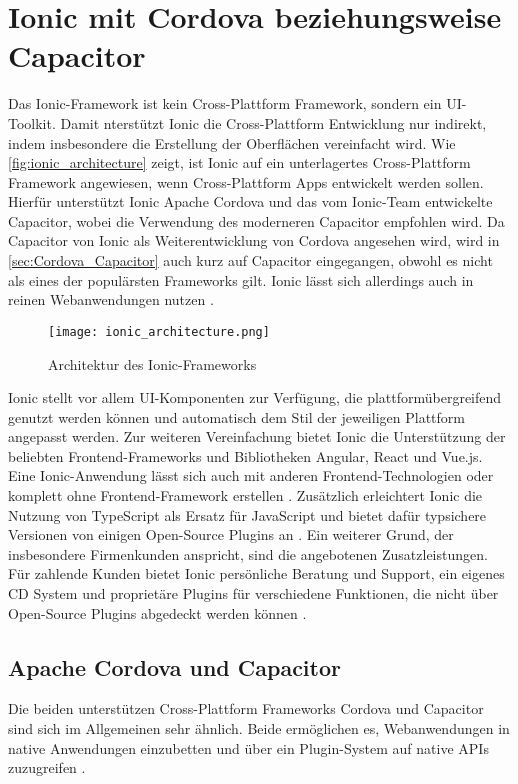 \section{Ionic mit Cordova beziehungsweise Capacitor}
\label{sec:Frameworks_Ionic}

Das Ionic-Framework ist kein Cross-Plattform Framework, sondern ein UI-Toolkit.
Damit nterstützt Ionic die Cross-Plattform Entwicklung nur indirekt, indem insbesondere die Erstellung der Oberflächen vereinfacht wird.
Wie \autoref{fig:ionic_architecture} zeigt, ist Ionic auf ein unterlagertes Cross-Plattform Framework angewiesen, wenn Cross-Plattform Apps entwickelt werden sollen.
Hierfür unterstützt Ionic Apache Cordova und das vom Ionic-Team entwickelte Capacitor, wobei die Verwendung des moderneren Capacitor empfohlen wird.
Da Capacitor von Ionic als Weiterentwicklung von Cordova angesehen wird, wird in \autoref{sec:Cordova_Capacitor} auch kurz auf Capacitor eingegangen, obwohl es nicht als eines der populärsten Frameworks gilt.
Ionic lässt sich allerdings auch in reinen Webanwendungen nutzen \cite{Ionic_Docs}.
\begin{figure}[h]
    \centering
    \texttt{[image: ionic\_architecture.png]}
    \caption{Architektur des Ionic-Frameworks \cite{Ionic_Architektur}}
    \label{fig:ionic_architecture}
\end{figure}
Ionic stellt vor allem UI-Komponenten zur Verfügung, die plattformübergreifend genutzt werden können und automatisch dem Stil der jeweiligen Plattform angepasst werden.
Zur weiteren Vereinfachung bietet Ionic die Unterstützung der beliebten Frontend-Frameworks und Bibliotheken Angular, React und Vue.js.
Eine Ionic-Anwendung lässt sich auch mit anderen Frontend-Technologien oder komplett ohne Frontend-Framework erstellen \cite{Ionic_Docs, Ionic_EvaluationGuide}.
Zusätzlich erleichtert Ionic die Nutzung von TypeScript als Ersatz für JavaScript und bietet dafür typsichere Versionen von einigen Open-Source Plugins an \cite{Liebel_Cordova_Capacitor}. 
Ein weiterer Grund, der insbesondere Firmenkunden anspricht, sind die angebotenen Zusatzleistungen.
Für zahlende Kunden bietet Ionic persönliche Beratung und Support, ein eigenes \ac{CD} System und proprietäre Plugins für verschiedene Funktionen, die nicht über Open-Source Plugins abgedeckt werden können \cite{Ionic_EvaluationGuide}.


\subsection{Apache Cordova und Capacitor}
\label{sec:Cordova_Capacitor}
Die beiden unterstützen Cross-Plattform Frameworks Cordova und Capacitor sind sich im Allgemeinen sehr ähnlich.
Beide ermöglichen es, Webanwendungen in native Anwendungen einzubetten und über ein Plugin-System auf native \acp{API} zuzugreifen \cite{Ionic_Cordova_vs_Capacitor}.


